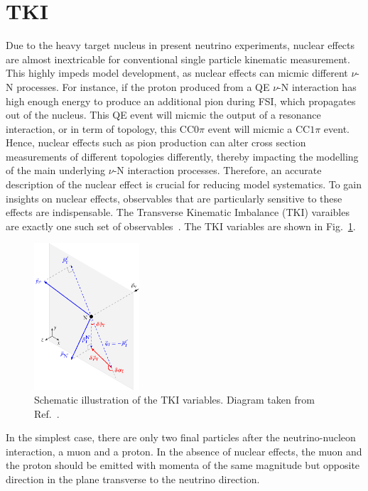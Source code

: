 \section{TKI}
\label{sec:nuint-tki}
Due to the heavy target nucleus in present neutrino experiments, nuclear effects are almost inextricable for conventional single particle kinematic measurement.
This highly impeds model development, as nuclear effects can micmic different $\nu$-N processes.
For instance, if the proton produced from a QE $\nu$-N interaction has high enough energy to produce an additional pion during FSI, which propagates out of the nucleus.
This QE event will micmic the output of a resonance interaction, or in term of topology, this CC$0\pi$ event will micmic a CC$1\pi$ event.
Hence, nuclear effects such as pion production can alter cross section measurements of different topologies differently, thereby impacting the modelling of the main underlying $\nu$-N interaction processes.
Therefore, an accurate description of the nuclear effect is crucial for reducing model systematics.
To gain insights on nuclear effects, observables that are particularly sensitive to these effects are indispensable. 
The Transverse Kinematic Imbalance (TKI) varaibles are exactly one such set of observables~\cite{Lu:2015hea, Lu:2015tcr}.
The TKI variables are shown in Fig.~\ref{fig:stki}.
\begin{figure}[!htb] 	
    \centering 		
    \includegraphics[width=0.35\textwidth]{figures/stki.eps}
    \caption{\label{fig:stki} Schematic illustration of the TKI variables. Diagram taken from Ref.~\cite{Lu:2015tcr}.} 
\end{figure}
In the simplest case, there are only two final particles after the neutrino-nucleon interaction, a muon and a proton. 
In the absence of nuclear effects, the muon and the proton should be emitted with momenta of the same magnitude but opposite direction in the plane transverse to the neutrino direction.
